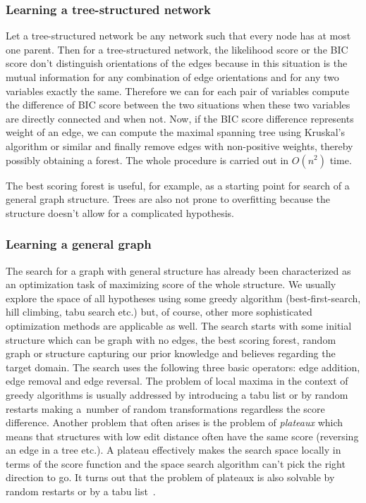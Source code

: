 \documentclass[english,cover]{fitthesis} %
\newcommand{\term}[1]{\emph{#1}}           %
\begin{document}
\subsubsection{Learning a tree-structured network}
Let a tree-structured network be any network such that every node has at most one parent. Then for a tree-structured network, the likelihood score or the BIC score don't distinguish orientations of the edges because in this situation is the mutual information for any combination of edge orientations and for any two variables exactly the same. Therefore we can for each pair of variables compute the difference of BIC score between the two situations when these two variables are directly connected and when not. Now, if the BIC score difference represents weight of an edge, we can compute the maximal spanning tree using Kruskal's algorithm or similar and finally remove edges with non-positive weights, thereby possibly obtaining a forest. The whole procedure is carried out in $O(n^2)$ time.

The best scoring forest is useful, for example, as a starting point for search of a general graph structure. Trees are also not prone to overfitting because the structure doesn't allow for a complicated hypothesis.

\subsubsection{Learning a general graph}
The search for a graph with general structure has already been characterized as an optimization task of maximizing score of the whole structure. We usually explore the space of all hypotheses using some greedy algorithm (best-first-search, hill climbing, tabu search etc.) but, of course, other more sophisticated optimization methods are applicable as well. The search starts with some initial structure which can be graph with no edges, the best scoring forest, random graph or structure capturing our prior knowledge and believes regarding the target domain. The search uses the following three basic operators: edge addition, edge removal and edge reversal. The problem of local maxima in the context of greedy algorithms is usually addressed by introducing a tabu list or by random restarts making a~number of random transformations regardless the score difference. Another problem that often arises is the problem of \term{plateaux} which means that structures with low edit distance often have the same score (reversing an edge in a tree etc.). A plateau effectively makes the search space locally  in terms of the score function and the space search algorithm can't pick the right direction to go. It turns out that the problem of plateaux is also solvable by random restarts or by a tabu list~\cite[p.~815]{pgm}.
\end{document}
